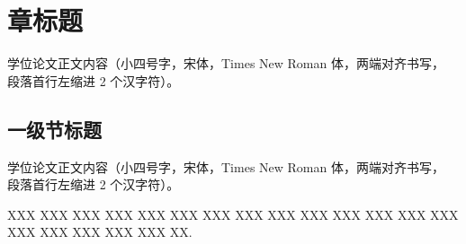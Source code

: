 \documentclass{westlakethesis}
\begin{document}
\maketitle

\frontmatter
\begin{abstract}[cn]
  随着 XXXXX 的发展，XXX 问题日益突出。本文提出了一种新型算法模型，融合了三项关键技术，
  通过实验设计，在数据集上验证了方法的有效性，取得了指标的性能提升。研究表明，
  该方法能够明显优势，为该问题提供了新的解决方法。
  XXX XXX XXX XXX XXX XXX XXX XXX XXX XXX XXX XXX XXX XXX XXX
  XXX XXX XXX XXX XXX XXX XXX XXX XXX XXX XXX XXX XXX XXX XXX
  XXX XXX XXX XXX XXX XXX XXX XXX XXX XXX XXX XXX XXX XXX XX.\par
  \zhlipsum[1]
\end{abstract}

\begin{abstract}[en]
  With the rapid development of financial technology (FinTech), traditional
  credit risk assessment models face challenges in processing large-scale,
  heterogeneous data. This study proposes a novel ensemble learning framework
  that combines deep neural networks with interpretable machine learning models
  to improve prediction accuracy while maintaining transparency.
  XXX XXX XXX XXX XXX XXX XXX XXX XXX XXX XXX XXX XXX XXX XXX
  XXX XXX XXX XXX XXX XXX XXX XXX XXX XXX XXX XXX XXX XXX XXX
  XXX XXX XXX XXX XXX XXX XXX XXX XXX XXX XXX XXX XXX XXX XX.\par
  \lipsum[1]
\end{abstract}

\tableofcontents
\mainmatter

\chapter{章标题}

学位论文正文内容（小四号字，宋体，Times New Roman 体，两端对齐书写，
段落首行左缩进 2 个汉字符）\cite{yang2009cernet}。

\section{一级节标题}

学位论文正文内容（小四号字，宋体，Times New Roman 体，两端对齐书写，
段落首行左缩进 2 个汉字符）。

XXX XXX XXX XXX XXX XXX XXX XXX XXX XXX XXX XXX XXX XXX XXX
XXX XXX XXX XXX XX\cite{bonjour2009minerals}.
\end{document}
